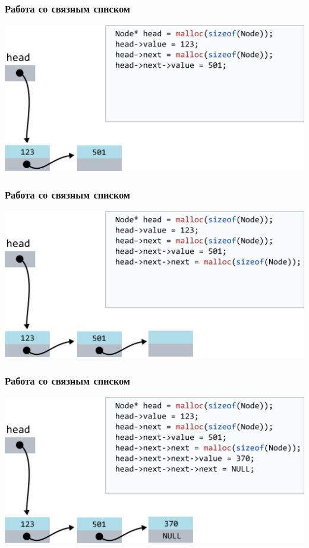 \documentclass[10pt,pdf,hyperref={unicode}]{beamer}
\begin{document}
\begin{frame}[fragile]
\frametitle{Работа со связным списком}
\begin{center}
\includegraphics[width=\imageSizeMult\linewidth]{../images/codelist/codelist5.png}
\end{center}
\end{frame}


\begin{frame}[fragile]
\frametitle{Работа со связным списком}
\begin{center}
\includegraphics[width=\imageSizeMult\linewidth]{../images/codelist/codelist6.png}
\end{center}
\end{frame}


\begin{frame}[fragile]
\frametitle{Работа со связным списком}
\begin{center}
\includegraphics[width=\imageSizeMult\linewidth]{../images/codelist/codelist7.png}
\end{center}
\end{frame}
\end{document}
